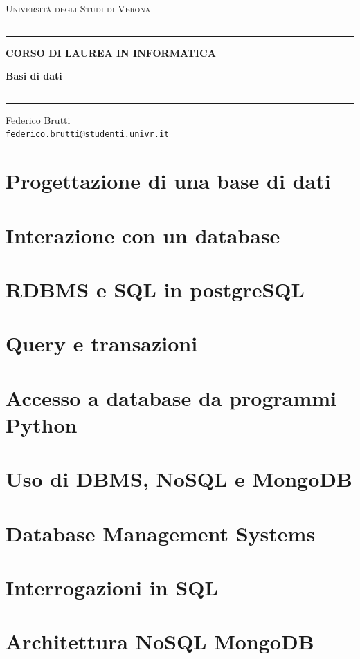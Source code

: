 \documentclass[12pt, a4paper, oneside]{book}
\begin{document}
	
	\begin{titlepage}
		\begin{center}
			{{\LARGE{\textsc{Università degli Studi di Verona}}}} \rule[0.1cm]{15.8cm}{0.1mm}
			\rule[0.5cm]{15.8cm}{0.6mm}
			{\small{\bf CORSO DI LAUREA IN INFORMATICA}}
		\end{center}
		\vspace{12.5mm}
		
		\begin{center}
			{\Huge{\bf Basi di dati}}
		\end{center}
		\vspace{130mm}
		
		\begin{minipage}[l]{1.8mm}
			\rule[0.1cm]{0.1mm}{2cm}
			\rule[0.1cm]{0.6mm}{2cm}
		\end{minipage}
		\hspace{2mm}
		\begin{minipage}{10cm}	
			{\large{Federico Brutti\\
			\texttt{federico.brutti@studenti.univr.it}}}
		\end{minipage}
	\end{titlepage}
	
	\blankpage
	\tableofcontents
	
	\chapter{Progettazione di una base di dati}
	
	\chapter{Interazione con un database}
	
	\chapter{RDBMS e SQL in postgreSQL}
	
	\chapter{Query e transazioni}
	
	\chapter{Accesso a database da programmi Python}
	
	\chapter{Uso di DBMS, NoSQL e MongoDB}
	
	\chapter{Database Management Systems}
	
	\chapter{Interrogazioni in SQL}
	
	\chapter{Architettura NoSQL MongoDB}
	
\end{document}
